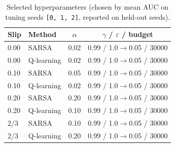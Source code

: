 \begin{table}[t]
\centering
\small
\caption{Selected hyperparameters (chosen by mean AUC on tuning seeds \texttt{[0, 1, 2]}, reported on held-out seeds).}
\label{tab:hparams}
\begin{tabular}{llcc}
\toprule
Slip & Method & $\alpha$ & $\gamma$ / $\varepsilon$ / budget \\
\midrule
0.00 & SARSA & 0.02 & 0.99 / 1.0$\to$0.05 / 30000 \\
0.00 & Q-learning & 0.02 & 0.99 / 1.0$\to$0.05 / 30000 \\
0.10 & SARSA & 0.05 & 0.99 / 1.0$\to$0.05 / 30000 \\
0.10 & Q-learning & 0.02 & 0.99 / 1.0$\to$0.05 / 30000 \\
0.20 & SARSA & 0.20 & 0.99 / 1.0$\to$0.05 / 30000 \\
0.20 & Q-learning & 0.10 & 0.99 / 1.0$\to$0.05 / 30000 \\
2/3 & SARSA & 0.10 & 0.99 / 1.0$\to$0.05 / 30000 \\
2/3 & Q-learning & 0.20 & 0.99 / 1.0$\to$0.05 / 30000 \\
\bottomrule
\end{tabular}
\end{table}